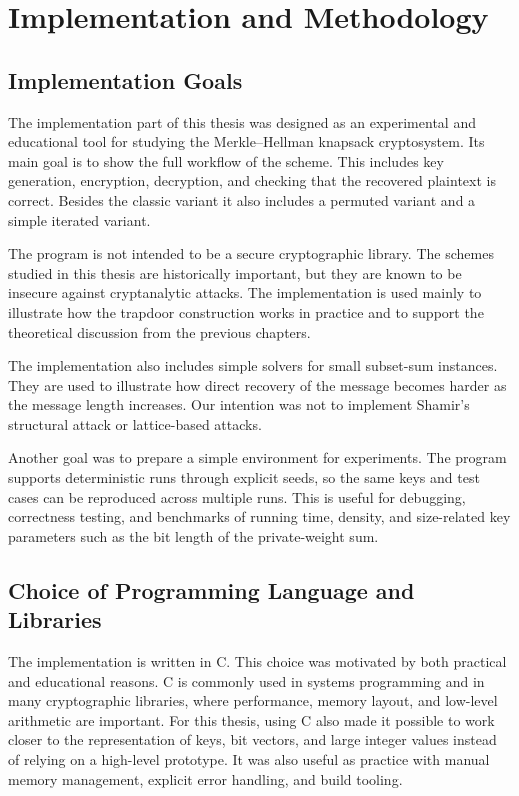 \chapter{Implementation and Methodology}

\section{Implementation Goals}

The implementation part of this thesis was designed as an experimental and
educational tool for studying the Merkle--Hellman knapsack cryptosystem. Its
main goal is to show the full workflow of the scheme. This includes key
generation, encryption, decryption, and checking that the recovered plaintext
is correct. Besides the classic variant it also includes a permuted variant and
a simple iterated variant.

The program is not intended to be a secure cryptographic library. The schemes
studied in this thesis are historically important, but they are known to be
insecure against cryptanalytic attacks. The implementation is used mainly to
illustrate how the trapdoor construction works in practice and to support the
theoretical discussion from the previous chapters.

The implementation also includes simple solvers for small subset-sum instances.
They are used to illustrate how direct recovery of the message becomes harder
as the message length increases. Our intention was not to implement Shamir's
structural attack or lattice-based attacks.

Another goal was to prepare a simple environment for experiments. The program
supports deterministic runs through explicit seeds, so the same keys and test
cases can be reproduced across multiple runs. This is useful for debugging,
correctness testing, and benchmarks of running time, density, and size-related
key parameters such as the bit length of the private-weight sum.

\section{Choice of Programming Language and Libraries}

The implementation is written in C. This choice was motivated by both practical
and educational reasons. C is commonly used in systems programming and in many
cryptographic libraries, where performance, memory layout, and low-level
arithmetic are important. For this thesis, using C also made it possible to work
closer to the representation of keys, bit vectors, and large integer values
instead of relying on a high-level prototype. It was also useful as practice
with manual memory management, explicit error handling, and build tooling.

